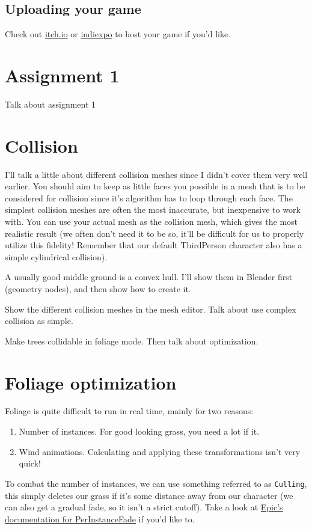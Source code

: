 \documentclass{article}
\begin{document}
	\subsection{Uploading your game}
	Check out \href{https://itch.io/}{itch.io} or \href{https://www.indiexpo.net/}{indiexpo} to host your game if you'd like.
	
	\section{Assignment 1}
	Talk about assignment 1
	
	\section{Collision}
	I'll talk a little about different collision meshes since I didn't cover them very well earlier. You should aim to keep as little faces you possible in a mesh that is to be considered for collision since it's algorithm has to loop through each face. The simplest collision meshes are often the most inaccurate, but inexpensive to work with. You can use your actual mesh as the collision mesh, which gives the most realistic result (we often don't need it to be so, it'll be difficult for us to properly utilize this fidelity! Remember that our default ThirdPerson character also has a simple cylindrical collision).
	
	A usually good middle ground is a convex hull. I'll show them in Blender first (geometry nodes), and then show how to create it.
	
	Show the different collision meshes in the mesh editor. Talk about use complex collision as simple.
	
	Make trees collidable in foliage mode. Then talk about optimization.
	
	\section{Foliage optimization}
	Foliage is quite difficult to run in real time, mainly for two reasons:
	\begin{enumerate}
		\item Number of instances. For good looking grass, you need a lot if it.
		\item Wind animations. Calculating and applying these transformations isn't very quick!
	\end{enumerate}
	To combat the number of instances, we can use something referred to as \verb*|Culling|, this simply deletes our grass if it's some distance away from our character (we can also get a gradual fade, so it isn't a strict cutoff). Take a look at \href{https://dev.epicgames.com/documentation/en-us/unreal-engine/foliage-mode-in-unreal-engine#culling-settings}{Epic's documentation for PerInstanceFade} if you'd like to.\\[10pt]
	
\end{document}
